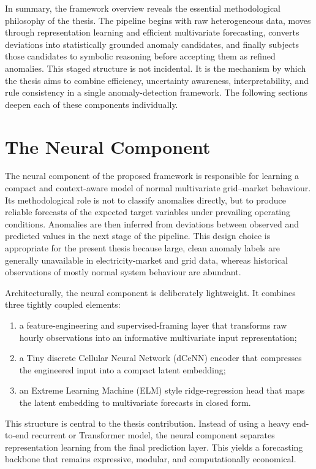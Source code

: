 In summary, the framework overview reveals the essential methodological philosophy of the thesis. The pipeline begins with raw heterogeneous data, moves through representation learning and efficient multivariate forecasting, converts deviations into statistically grounded anomaly candidates, and finally subjects those candidates to symbolic reasoning before accepting them as refined anomalies. This staged structure is not incidental. It is the mechanism by which the thesis aims to combine efficiency, uncertainty awareness, interpretability, and rule consistency in a single anomaly-detection framework. The following sections deepen each of these components individually.


\section{The Neural Component}
\label{sec:neural_component}

The neural component of the proposed framework is responsible for learning a compact and context-aware model of normal multivariate grid--market behaviour. Its methodological role is not to classify anomalies directly, but to produce reliable forecasts of the expected target variables under prevailing operating conditions. Anomalies are then inferred from deviations between observed and predicted values in the next stage of the pipeline. This design choice is appropriate for the present thesis because large, clean anomaly labels are generally unavailable in electricity-market and grid data, whereas historical observations of mostly normal system behaviour are abundant.

Architecturally, the neural component is deliberately lightweight. It combines three tightly coupled elements:
\begin{enumerate}
	\item a feature-engineering and supervised-framing layer that transforms raw hourly observations into an informative multivariate input representation;
	\item a Tiny discrete Cellular Neural Network (dCeNN) encoder that compresses the engineered input into a compact latent embedding;
	\item an Extreme Learning Machine (ELM) style ridge-regression head that maps the latent embedding to multivariate forecasts in closed form.
\end{enumerate}
This structure is central to the thesis contribution. Instead of using a heavy end-to-end recurrent or Transformer model, the neural component separates representation learning from the final prediction layer. This yields a forecasting backbone that remains expressive, modular, and computationally economical.

